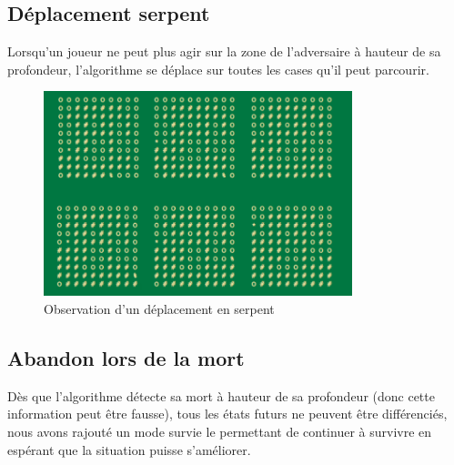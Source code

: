 \subsection{Déplacement serpent}
Lorsqu’un joueur ne peut plus agir sur la zone de l'adversaire à    hauteur de sa profondeur, l'algorithme se déplace sur toutes les cases    qu'il peut parcourir.



\begin{figure}[H]
	\centering
	\includegraphics[width=0.8\textwidth, keepaspectratio, height=0.5\textheight]{./pics/serpent.png}	
	\caption{Observation d'un déplacement en serpent}
\end{figure}

\subsection{Abandon lors de la mort}

Dès que l'algorithme détecte sa mort à hauteur de sa profondeur    (donc cette information peut être fausse), tous les états futurs ne    peuvent être différenciés, nous avons rajouté un mode survie le permettant    de continuer à survivre en espérant que la situation puisse s'améliorer.



